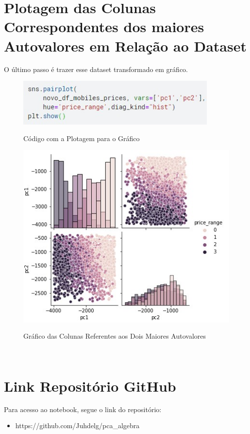 \documentclass{report}
\begin{document}
\section{Plotagem das Colunas Correspondentes dos maiores Autovalores em Relação ao Dataset}
O último passo é trazer esse dataset transformado em gráfico.

\begin{figure}[H]
\centering
\caption{Código com a Plotagem para o Gráfico}
\includegraphics[width=10cm]{figures/cod_plot.jpg}
\label{figura com o código da plotagem do gráfico}
\end{figure}

\begin{figure}[H]
\centering
\caption{Gráfico das Colunas Referentes aos Dois Maiores Autovalores}
\includegraphics[width=12cm]{figures/plot_novo_dataset.jpg}
\label{figura com o gráfico das colunas referentes aos dois maiores autovalores}
\end{figure}
\
\section{Link Repositório GitHub}
Para acesso ao notebook, segue o link do repositório:
\begin{itemize}
    \item https://github.com/Juhdelg/pca\_algebra
\end{itemize}
\end{document}
